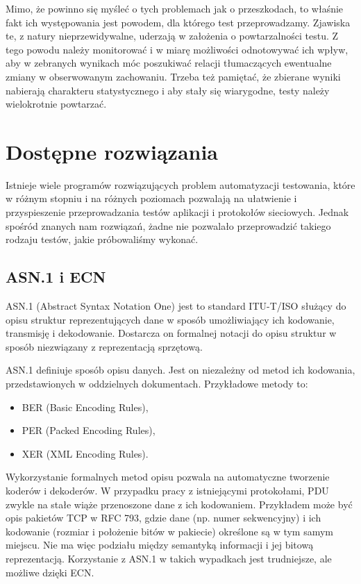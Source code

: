 \documentclass[00-praca-magisterska.tex]{subfiles}
\begin{document}
Mimo, że powinno się myśleć o tych problemach jak o przeszkodach, to właśnie
fakt ich występowania jest powodem, dla którego test przeprowadzamy. Zjawiska
te, z natury nieprzewidywalne, uderzają w założenia o powtarzalności testu. Z
tego powodu należy monitorować i w miarę możliwości odnotowywać ich wpływ, aby
w zebranych wynikach móc poszukiwać relacji tłumaczących ewentualne zmiany w
obserwowanym zachowaniu. Trzeba też pamiętać, że zbierane wyniki nabierają
charakteru statystycznego i aby stały się wiarygodne, testy należy wielokrotnie
powtarzać.

\section{Dostępne rozwiązania}


Istnieje wiele programów rozwiązujących problem automatyzacji testowania, które
w różnym stopniu i na różnych poziomach pozwalają na ułatwienie i przyspieszenie
przeprowadzania testów aplikacji i protokołów sieciowych. Jednak spośród znanych
nam rozwiązań, żadne nie pozwalało przeprowadzić takiego rodzaju testów, jakie
próbowaliśmy wykonać.

\subsection{ASN.1 i ECN}
ASN.1 (Abstract Syntax Notation One) jest to standard ITU-T/ISO służący do opisu
struktur reprezentujących dane w sposób umożliwiający ich kodowanie, transmisję
i dekodowanie. Dostarcza on formalnej notacji do opisu struktur w sposób
niezwiązany z reprezentacją sprzętową.

ASN.1 definiuje sposób opisu danych. Jest on niezależny od metod ich kodowania,
przedstawionych w oddzielnych dokumentach. Przykładowe metody to:
\begin{itemize}
\item BER (Basic Encoding Rules),
\item PER (Packed Encoding Rules),
\item XER (XML Encoding Rules).
\end{itemize}

Wykorzystanie formalnych metod opisu pozwala na automatyczne tworzenie koderów i
dekoderów. W przypadku pracy z istniejącymi protokołami, PDU zwykle na stałe
wiąże przenoszone dane z ich kodowaniem. Przykładem może być opis pakietów TCP w
RFC 793, gdzie dane (np. numer sekwencyjny) i ich kodowanie (rozmiar i
położenie bitów w pakiecie) określone są w tym samym miejscu. Nie ma więc
podziału między semantyką informacji i jej bitową reprezentacją. Korzystanie z
ASN.1 w takich wypadkach jest trudniejsze, ale możliwe dzięki ECN.
\end{document}
